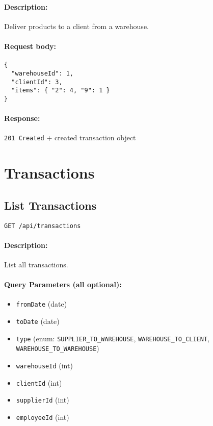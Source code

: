 \documentclass[a4paper,11pt]{article}
\begin{document}
\paragraph{Description:} Deliver products to a client from a warehouse.
\paragraph{Request body:}
\begin{verbatim}
{
  "warehouseId": 1,
  "clientId": 3,
  "items": { "2": 4, "9": 1 }
}
\end{verbatim}
\paragraph{Response:} \texttt{201 Created} + created transaction object

\section{Transactions}
\label{sec:transactions}

\subsection{List Transactions}
\label{sec:transactions-all}
\begin{verbatim}
GET /api/transactions
\end{verbatim}
\paragraph{Description:} List all transactions.
\paragraph{Query Parameters (all optional):}
\begin{itemize}
  \item \texttt{fromDate} (date)
  \item \texttt{toDate} (date)
  \item \texttt{type} (enum: \texttt{SUPPLIER_TO_WAREHOUSE}, \texttt{WAREHOUSE_TO_CLIENT}, \texttt{WAREHOUSE_TO_WAREHOUSE})
  \item \texttt{warehouseId} (int)
  \item \texttt{clientId} (int)
  \item \texttt{supplierId} (int)
  \item \texttt{employeeId} (int)
\end{itemize}
\end{document}
